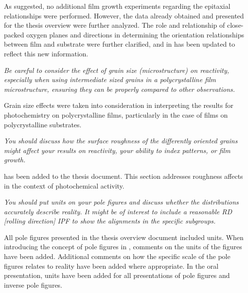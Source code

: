 \documentclass[12pt,%
               letterpaper,
               oneside]{uiothesis}
\begin{document}
\begin{enum}
  As suggested, no additional film growth experiments regarding the epitaxial
relationships were performed. However, the data already obtained and presented for the
thesis overview were further analyzed. The role and relationship of close-packed oxygen
planes and directions in determining the orientation relationships between film and
substrate were further clarified, and  in
 has been updated to reflect this new
information.\vspace{16pt}
  
  \item \emph{Be careful to consider the effect of grain size (microstructure) on
reactivity, especially when using intermediate sized grains in a polycrystalline film
microstructure, ensuring they can be properly compared to other observations.}\vspace{8pt}
  
  Grain size effects were taken into consideration in interpreting the results for
photochemistry on polycrystalline films, particularly in the case of films on
polycrystalline substrates. \vspace{16pt}
  
  \item \emph{You should discuss how the surface roughness of the differently oriented
grains might affect your results on reactivity, your ability to index patterns, or film
growth.} \vspace{8pt}
  
   has been added to the thesis
document. This section addresses roughness affects in the context of photochemical
activity.\vspace{16pt}
  
  \item \emph{You should put units on  your pole figures and discuss whether the
distributions accurately describe reality. It might be of interest to include a reasonable
RD [rolling direction] IPF to show the alignments in the specific subgroups.} \vspace{8pt}
  
  All pole figures presented in the thesis overview document included units. When
introducing the concept of pole figures in , comments on
the units of the figures have been added. Additional comments on how the specific scale of
the pole figures relates to reality have been added where appropriate. In the oral
presentation, units have been added for all presentations of pole figures and inverse pole
figures.\vspace{16pt}
  

\end{enum}
\end{document}
